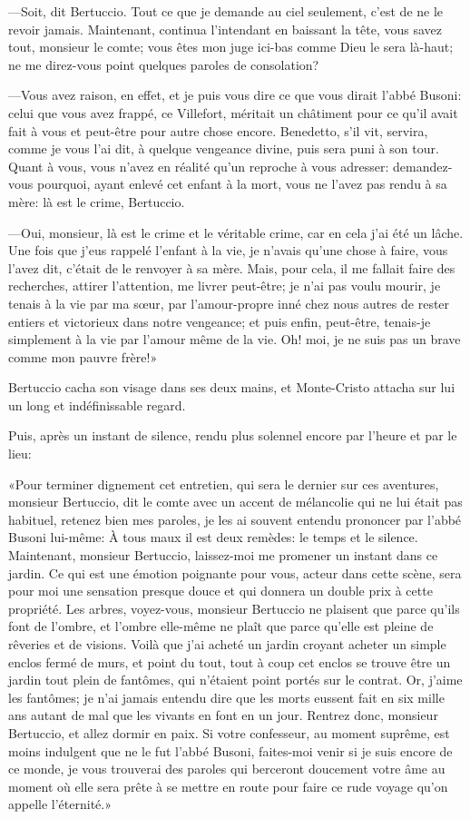 —Soit, dit Bertuccio. Tout ce que je demande au ciel seulement, c'est de ne le revoir jamais. Maintenant, continua l'intendant en baissant la tête, vous savez tout, monsieur le comte; vous êtes mon juge ici-bas comme Dieu le sera là-haut; ne me direz-vous point quelques paroles de consolation? 

—Vous avez raison, en effet, et je puis vous dire ce que vous dirait l'abbé Busoni: celui que vous avez frappé, ce Villefort, méritait un châtiment pour ce qu'il avait fait à vous et peut-être pour autre chose encore. Benedetto, s'il vit, servira, comme je vous l'ai dit, à quelque vengeance divine, puis sera puni à son tour. Quant à vous, vous n'avez en réalité qu'un reproche à vous adresser: demandez-vous pourquoi, ayant enlevé cet enfant à la mort, vous ne l'avez pas rendu à sa mère: là est le crime, Bertuccio. 

—Oui, monsieur, là est le crime et le véritable crime, car en cela j'ai été un lâche. Une fois que j'eus rappelé l'enfant à la vie, je n'avais qu'une chose à faire, vous l'avez dit, c'était de le renvoyer à sa mère. Mais, pour cela, il me fallait faire des recherches, attirer l'attention, me livrer peut-être; je n'ai pas voulu mourir, je tenais à la vie par ma sœur, par l'amour-propre inné chez nous autres de rester entiers et victorieux dans notre vengeance; et puis enfin, peut-être, tenais-je simplement à la vie par l'amour même de la vie. Oh! moi, je ne suis pas un brave comme mon pauvre frère!» 

Bertuccio cacha son visage dans ses deux mains, et Monte-Cristo attacha sur lui un long et indéfinissable regard. 

Puis, après un instant de silence, rendu plus solennel encore par l'heure et par le lieu: 

«Pour terminer dignement cet entretien, qui sera le dernier sur ces aventures, monsieur Bertuccio, dit le comte avec un accent de mélancolie qui ne lui était pas habituel, retenez bien mes paroles, je les ai souvent entendu prononcer par l'abbé Busoni lui-même: À tous maux il est deux remèdes: le temps et le silence. Maintenant, monsieur Bertuccio, laissez-moi me promener un instant dans ce jardin. Ce qui est une émotion poignante pour vous, acteur dans cette scène, sera pour moi une sensation presque douce et qui donnera un double prix à cette propriété. Les arbres, voyez-vous, monsieur Bertuccio ne plaisent que parce qu'ils font de l'ombre, et l'ombre elle-même ne plaît que parce qu'elle est pleine de rêveries et de visions. Voilà que j'ai acheté un jardin croyant acheter un simple enclos fermé de murs, et point du tout, tout à coup cet enclos se trouve être un jardin tout plein de fantômes, qui n'étaient point portés sur le contrat. Or, j'aime les fantômes; je n'ai jamais entendu dire que les morts eussent fait en six mille ans autant de mal que les vivants en font en un jour. Rentrez donc, monsieur Bertuccio, et allez dormir en paix. Si votre confesseur, au moment suprême, est moins indulgent que ne le fut l'abbé Busoni, faites-moi venir si je suis encore de ce monde, je vous trouverai des paroles qui berceront doucement votre âme au moment où elle sera prête à se mettre en route pour faire ce rude voyage qu'on appelle l'éternité.» 

